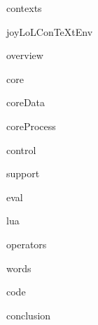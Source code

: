 
\usemodule[t-diSimp]

\startDiSimpComponent contexts

\diSimpEnvironment joyLoLConTeXtEnv

\startJoyLoLCoAlg[title=Contexts][contexts]

\diSimpComponent overview

\diSimpComponent core

\diSimpComponent coreData

\diSimpComponent coreProcess

\diSimpComponent control

\diSimpComponent support

\diSimpComponent eval

\diSimpComponent lua

\diSimpComponent operators

\diSimpComponent words

\diSimpComponent code

\diSimpComponent conclusion

\stopJoyLoLCoAlg

\stopDiSimpComponent
